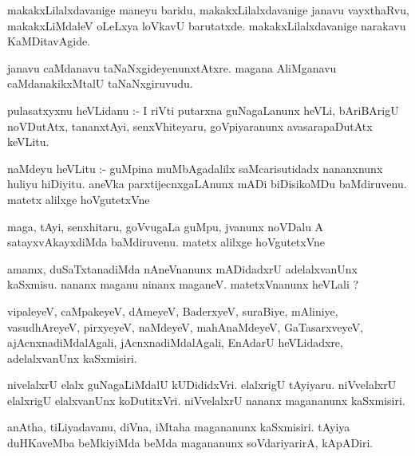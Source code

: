 \documentclass{article}
\begin{document}
\begin{mn}
makakxLilalxdavanige  maneyu  baridu,  makakxLilalxdavanige  janavu  vayxthaRvu,  
makakxLiMdaleV  oLeLxya  loVkavU  barutatxde.  makakxLilalxdavanige  narakavu  KaMDitavAgide.
\end{mn}

\begin{mn}
janavu  caMdanavu  taNaNxgideyenunxtAtxre.  magana  AliMganavu  caMdanakikxMtalU  taNaNxgiruvudu.
\end{mn}

\begin{mn}
pulasatxyxnu  heVLidanu :-  I riVti  putarxna  guNagaLanunx  heVLi,  bAriBArigU  noVDutAtx,  
tananxtAyi,  senxVhiteyaru,  goVpiyaranunx  avasarapaDutAtx  keVLitu.  
\end{mn}

\begin{mn}
naMdeyu  heVLitu :- guMpina  muMbAgadalilx  saMcarisutidadx  nananxnunx  huliyu  hiDiyitu.  
aneVka  parxtijecnxgaLAnunx mADi  biDisikoMDu  baMdiruvenu.  matetx  alilxge  hoVgutetxVne
\end{mn}

\begin{mn}
maga,  tAyi,  senxhitaru,  goVvugaLa  guMpu,  jvanunx  noVDalu  A satayxvAkayxdiMda  baMdiruvenu.  
matetx  alilxge  hoVgutetxVne
\end{mn}

\begin{mn}
amamx,  duSaTxtanadiMda  nAneVnanunx  mADidadxrU  adelalxvanUnx  kaSxmisu.  nananx  maganu  
ninanx  maganeV.  matetxVnanunx  heVLali ?  
\end{mn}

\begin{mn}
vipaleyeV,  caMpakeyeV,  dAmeyeV,  BaderxyeV,  suraBiye,  mAliniye,  vasudhAreyeV,  
pirxyeyeV,  naMdeyeV,  mahAnaMdeyeV,  GaTasarxveyeV,  ajAcnxnadiMdalAgali,  
jAcnxnadiMdalAgali,  EnAdarU  heVLidadxre,  adelalxvanUnx  kaSxmisiri.
\end{mn}

\begin{mn}
nivelalxrU  elalx  guNagaLiMdalU  kUDididxVri.  elalxrigU  tAyiyaru.  niVvelalxrU  
elalxrigU  elalxvanUnx  koDutitxVri.  niVvelalxrU  nananx  magananunx  kaSxmisiri.  
\end{mn}

\begin{mn}
anAtha,  tiLiyadavanu,  diVna,  iMtaha  magananunx  kaSxmisiri.  tAyiya  duHKaveMba  
beMkiyiMda  beMda  magananunx  soVdariyarirA,  kApADiri.
\end{mn}
\end{document}
